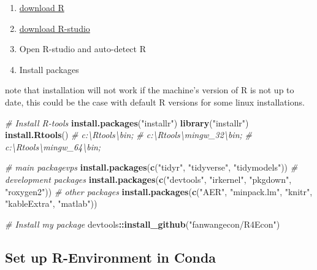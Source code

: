 \documentclass[
]{article}
\newenvironment{Shaded}{\begin{snugshade}}{\end{snugshade}}
\newcommand{\CommentTok}[1]{\textcolor[rgb]{0.56,0.35,0.01}{\textit{#1}}}
\newcommand{\KeywordTok}[1]{\textcolor[rgb]{0.13,0.29,0.53}{\textbf{#1}}}
\newcommand{\NormalTok}[1]{#1}
\newcommand{\OperatorTok}[1]{\textcolor[rgb]{0.81,0.36,0.00}{\textbf{#1}}}
\newcommand{\StringTok}[1]{\textcolor[rgb]{0.31,0.60,0.02}{#1}}
\providecommand{\tightlist}{%
  \setlength{\itemsep}{0pt}\setlength{\parskip}{0pt}}
\begin{document}
\begin{enumerate}
\def\labelenumi{\arabic{enumi}.}
\tightlist
\item
  \href{https://cloud.r-project.org/}{download R}
\item
  \href{https://rstudio.com/products/rstudio/download/}{download
  R-studio}
\item
  Open R-studio and auto-detect R
\item
  Install packages
\end{enumerate}

note that installation will not work if the machine's version of R is
not up to date, this could be the case with default R versions for some
linux installations.

\begin{Shaded}
\begin{Highlighting}[]
\CommentTok{# Install R-tools}
\KeywordTok{install.packages}\NormalTok{(}\StringTok{"installr"}\NormalTok{)}
\KeywordTok{library}\NormalTok{(}\StringTok{"installr"}\NormalTok{)}
\KeywordTok{install.Rtools}\NormalTok{()}
\CommentTok{# c:\textbackslash{}Rtools\textbackslash{}bin;}
\CommentTok{# c:\textbackslash{}Rtools\textbackslash{}mingw_32\textbackslash{}bin;}
\CommentTok{# c:\textbackslash{}Rtools\textbackslash{}mingw_64\textbackslash{}bin;}

\CommentTok{# main packagevps}
\KeywordTok{install.packages}\NormalTok{(}\KeywordTok{c}\NormalTok{(}\StringTok{"tidyr"}\NormalTok{, }\StringTok{"tidyverse"}\NormalTok{, }\StringTok{"tidymodels"}\NormalTok{))}
\CommentTok{# development packages}
\KeywordTok{install.packages}\NormalTok{(}\KeywordTok{c}\NormalTok{(}\StringTok{"devtools"}\NormalTok{, }\StringTok{"irkernel"}\NormalTok{, }\StringTok{"pkgdown"}\NormalTok{, }\StringTok{"roxygen2"}\NormalTok{))}
\CommentTok{# other packages}
\KeywordTok{install.packages}\NormalTok{(}\KeywordTok{c}\NormalTok{(}\StringTok{"AER"}\NormalTok{, }\StringTok{"minpack.lm"}\NormalTok{, }\StringTok{"knitr"}\NormalTok{, }\StringTok{"kableExtra"}\NormalTok{, }\StringTok{"matlab"}\NormalTok{))}

\CommentTok{# Install my package}
\NormalTok{devtools}\OperatorTok{::}\KeywordTok{install_github}\NormalTok{(}\StringTok{"fanwangecon/R4Econ"}\NormalTok{)}
\end{Highlighting}
\end{Shaded}

\hypertarget{set-up-r-environment-in-conda}{%
\subsection{Set up R-Environment in
Conda}\label{set-up-r-environment-in-conda}}
\end{document}
